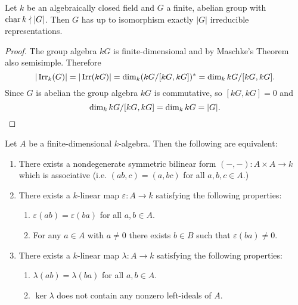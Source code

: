 \begin{cor}\label{cor: number of irreducible representations of finite abelian group}
 Let $k$ be an algebraically closed field and $G$ a finite, abelian group with $\operatorname{char} k \nmid |G|$. Then $G$ has up to isomorphism exactly $|G|$ irreducible representations.
\end{cor}
\begin{proof}
 The group algebra $kG$ is finite-dimensional and by Maschke’s Theorem also semisimple. Therefore
 \[
  |\operatorname{Irr}_k(G)| = |\operatorname{Irr}(kG)| = \dim_k (kG/[kG, kG])^* = \dim_k kG/[kG, kG].
 \]
 Since $G$ is abelian the group algebra $kG$ is commutative, so $[kG,kG] = 0$ and
 \[
  \dim_k kG/[kG, kG] = \dim_k kG = |G|.
  \qedhere
 \]
\end{proof}


\begin{prop}
 Let $A$ be a finite-dimensional $k$-algebra. Then the following are equivalent:
 \begin{enumerate}[label=\emph{\roman*)},leftmargin=*]
  \item \label{enum: nondegenerate symmetric associative bilinear form}
   There exists a nondegenerate symmetric bilinear form $(-,-) \colon A \times A \to k$ which is associative (i.e. $(ab,c) = (a,bc)$ for all $a,b,c \in A$.)
  \item \label{enum: nondegenerato linear map}
   There exists a $k$-linear map $\varepsilon \colon A \to k$ satisfying the following properties:
   \begin{enumerate}[label=\emph{(\roman*)},leftmargin=*]
    \item
     $\varepsilon(ab) = \varepsilon(ba)$ for all $a,b \in A$.
    \item
     For any $a \in A$ with $a \neq 0$ there exists $b \in B$ such that $\varepsilon(ba) \neq 0$.
   \end{enumerate}
  \item \label{enum: no nonzero ideals in kernel of linear map}
   There exists a $k$-linear map $\lambda \colon A \to k$ satisfying the following properties:
   \begin{enumerate}[label=\emph{(\roman*)},leftmargin=*]
    \item
     $\lambda(ab) = \lambda(ba)$ for all $a,b \in A$.
    \item
     $\ker \lambda$ does not contain any nonzero left-ideals of $A$.
   \end{enumerate}
 \end{enumerate}
\end{prop}
